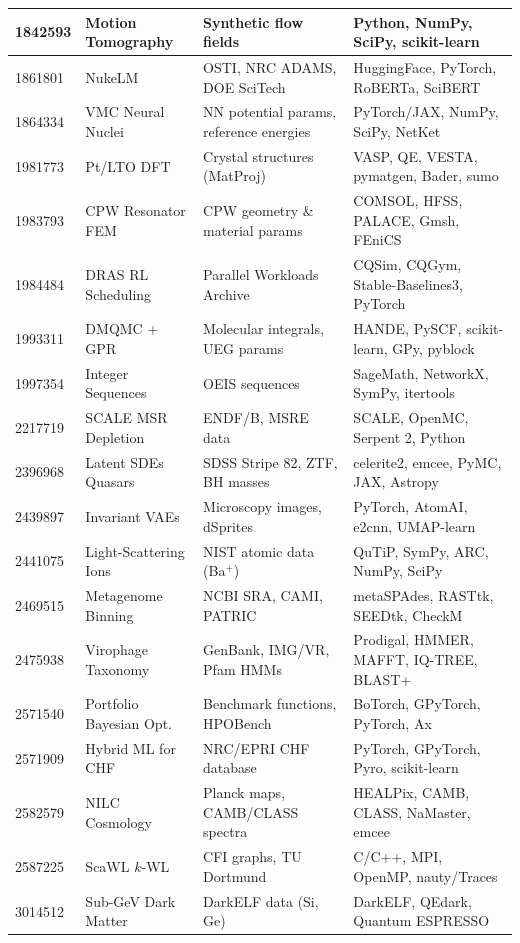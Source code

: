 \documentclass[11pt,a4paper]{article}
\begin{document}
\begin{longtable}{p{1.2cm} p{3.2cm} p{4cm} p{5.5cm}}
\midrule
1842593 & Motion Tomography & Synthetic flow fields & Python, NumPy, SciPy, scikit-learn \\
\midrule
1861801 & NukeLM & OSTI, NRC ADAMS, DOE SciTech & HuggingFace, PyTorch, RoBERTa, SciBERT \\
\midrule
1864334 & VMC Neural Nuclei & NN potential params, reference energies & PyTorch/JAX, NumPy, SciPy, NetKet \\
\midrule
1981773 & Pt/LTO DFT & Crystal structures (MatProj) & VASP, QE, VESTA, pymatgen, Bader, sumo \\
\midrule
1983793 & CPW Resonator FEM & CPW geometry \& material params & COMSOL, HFSS, PALACE, Gmsh, FEniCS \\
\midrule
1984484 & DRAS RL Scheduling & Parallel Workloads Archive & CQSim, CQGym, Stable-Baselines3, PyTorch \\
\midrule
1993311 & DMQMC + GPR & Molecular integrals, UEG params & HANDE, PySCF, scikit-learn, GPy, pyblock \\
\midrule
1997354 & Integer Sequences & OEIS sequences & SageMath, NetworkX, SymPy, itertools \\
\midrule
2217719 & SCALE MSR Depletion & ENDF/B, MSRE data & SCALE, OpenMC, Serpent 2, Python \\
\midrule
2396968 & Latent SDEs Quasars & SDSS Stripe 82, ZTF, BH masses & celerite2, emcee, PyMC, JAX, Astropy \\
\midrule
2439897 & Invariant VAEs & Microscopy images, dSprites & PyTorch, AtomAI, e2cnn, UMAP-learn \\
\midrule
2441075 & Light-Scattering Ions & NIST atomic data (Ba$^+$) & QuTiP, SymPy, ARC, NumPy, SciPy \\
\midrule
2469515 & Metagenome Binning & NCBI SRA, CAMI, PATRIC & metaSPAdes, RASTtk, SEEDtk, CheckM \\
\midrule
2475938 & Virophage Taxonomy & GenBank, IMG/VR, Pfam HMMs & Prodigal, HMMER, MAFFT, IQ-TREE, BLAST+ \\
\midrule
2571540 & Portfolio Bayesian Opt. & Benchmark functions, HPOBench & BoTorch, GPyTorch, PyTorch, Ax \\
\midrule
2571909 & Hybrid ML for CHF & NRC/EPRI CHF database & PyTorch, GPyTorch, Pyro, scikit-learn \\
\midrule
2582579 & NILC Cosmology & Planck maps, CAMB/CLASS spectra & HEALPix, CAMB, CLASS, NaMaster, emcee \\
\midrule
2587225 & ScaWL $k$-WL & CFI graphs, TU Dortmund & C/C++, MPI, OpenMP, nauty/Traces \\
\midrule
3014512 & Sub-GeV Dark Matter & DarkELF data (Si, Ge) & DarkELF, QEdark, Quantum ESPRESSO \\

\bottomrule
\end{longtable}
\normalsize
\end{document}
